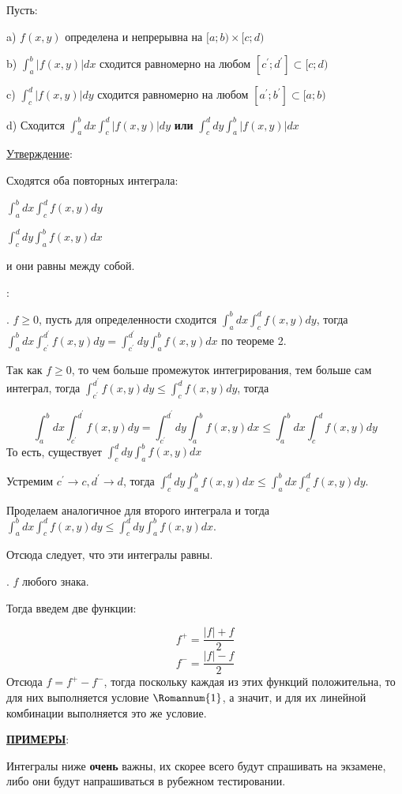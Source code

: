 \documentclass[12pt]{article}
\begin{document}
Пусть:\par
a) $f(x,y)$ определена и непрерывна на $[a;b) \times [c;d)$\par
b) $\int_a^b |f(x,y) |dx$ сходится равномерно на любом $[c^{'};d^{'}] \subset [c;d)$\par
c) $\int_c^d |f(x,y) |dy$ сходится равномерно на любом $[a^{'};b^{'}] \subset [a;b)$\par 
d) Сходится $\int_a^b dx \int_c^d |f(x,y)|dy$ \textbf{или} $\int_c^d dy \int_a^b |f(x,y)|dx$\par
\uline{Утверждение}:\par
Сходятся оба повторных интеграла:\par
\indent $\int_a^b dx \int_c^d f(x,y) dy$\par
\indent $\int_c^d dy \int_a^b f(x,y) dx$\par
и они равны между собой.\par
{}:\par
{}. $f \geq 0$, пусть для определенности сходится $\int_a^b dx \int_c^d f(x,y) dy$, тогда $\int_a^b dx \int_{c^{'}}^{d^{'}} f(x,y) dy = \int_{c^{'}}^{d^{'}} dy \int_a^b f(x,y) dx$ по теореме 2.\par
Так как $f \geq 0$, то чем больше промежуток интегрирования, тем больше сам интеграл, тогда $\int_{c^{'}}^{d^{'}} f(x,y) dy \leq \int_c^d f(x,y) dy$, тогда\par
$$\int_a^b dx \int_{c^{'}}^{d^{'}} f(x,y) dy = \int_{c^{'}}^{d^{'}} dy \int_a^b f(x,y) dx \leq \int_a^b dx \int_c^d f(x,y) dy$$
То есть, существует $\int_c^d dy \int_a^b f(x,y) dx$\par
Устремим $c^{'} \to c, d^{'} \to d$, тогда $\int_c^d dy \int_a^b f(x,y) dx \leq \int_a^b dx \int_c^d f(x,y) dy$.\par
Проделаем аналогичное для второго интеграла и тогда $\int_a^b dx \int_c^d f(x,y) dy \leq \int_c^d dy \int_a^b f(x,y) dx$.\par
Отсюда следует, что эти интегралы равны.\par
{}. $f$ любого знака.\par
Тогда введем две функции:\par
$$f^{+} = \frac{|f| + f}{2}$$
$$f^{-} = \frac{|f| - f}{2}$$
Отсюда $f = f^{+} - f^{-}$, тогда поскольку каждая из этих функций положительна, то для них выполняется условие $\Romannum{1}$, а значит, и для их линейной комбинации выполняется это же условие.\par
\uline{\textbf{ПРИМЕРЫ}}:\par
Интегралы ниже \textbf{очень} важны, их скорее всего будут спрашивать на экзамене, либо они будут напрашиваться в рубежном тестировании.\par
\end{document}

